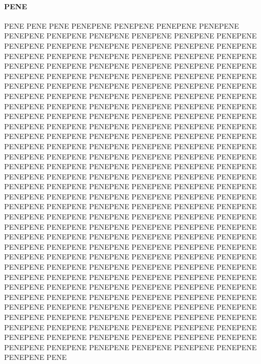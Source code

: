 \paragraph{PENE}
PENE PENE PENE PENEPENE PENEPENE PENEPENE PENEPENE PENEPENE PENEPENE PENEPENE PENEPENE PENEPENE PENEPENE PENEPENE PENEPENE PENEPENE PENEPENE PENEPENE PENEPENE PENEPENE PENEPENE PENEPENE PENEPENE PENEPENE PENEPENE PENEPENE PENEPENE PENEPENE PENEPENE PENEPENE PENEPENE PENEPENE PENEPENE PENEPENE PENEPENE PENEPENE PENEPENE PENEPENE PENEPENE PENEPENE PENEPENE PENEPENE PENEPENE PENEPENE PENEPENE PENEPENE PENEPENE PENEPENE PENEPENE PENEPENE PENEPENE PENEPENE PENEPENE PENEPENE PENEPENE PENEPENE PENEPENE PENEPENE PENEPENE PENEPENE PENEPENE PENEPENE PENEPENE PENEPENE PENEPENE PENEPENE PENEPENE PENEPENE PENEPENE PENEPENE PENEPENE PENEPENE PENEPENE PENEPENE PENEPENE PENEPENE PENEPENE PENEPENE PENEPENE PENEPENE PENEPENE PENEPENE PENEPENE PENEPENE PENEPENE PENEPENE PENEPENE PENEPENE PENEPENE PENEPENE PENEPENE PENEPENE PENEPENE PENEPENE PENEPENE PENEPENE PENEPENE PENEPENE PENEPENE PENEPENE PENEPENE PENEPENE PENEPENE PENEPENE PENEPENE PENEPENE PENEPENE PENEPENE PENEPENE PENEPENE PENEPENE PENEPENE PENEPENE PENEPENE PENEPENE PENEPENE PENEPENE PENEPENE PENEPENE PENEPENE PENEPENE PENEPENE PENEPENE PENEPENE PENEPENE PENEPENE PENEPENE PENEPENE PENEPENE PENEPENE PENEPENE PENEPENE PENEPENE PENEPENE PENEPENE PENEPENE PENEPENE PENEPENE PENEPENE PENEPENE PENEPENE PENEPENE PENEPENE PENEPENE PENEPENE PENEPENE PENEPENE PENEPENE PENEPENE PENEPENE PENEPENE PENEPENE PENEPENE PENEPENE PENEPENE PENEPENE PENEPENE PENEPENE PENEPENE PENEPENE PENEPENE PENEPENE PENEPENE PENEPENE PENEPENE PENEPENE PENEPENE PENEPENE PENEPENE PENEPENE PENEPENE PENEPENE PENEPENE PENEPENE PENEPENE PENEPENE PENEPENE PENEPENE PENEPENE PENEPENE PENEPENE PENEPENE PENEPENE PENEPENE PENEPENE PENEPENE PENEPENE PENEPENE PENEPENE PENEPENE PENEPENE PENEPENE PENEPENE PENEPENE PENEPENE PENEPENE PENEPENE PENEPENE PENEPENE PENEPENE PENE